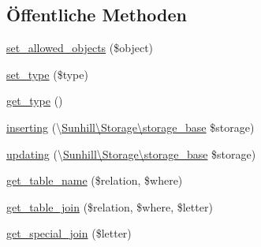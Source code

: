 \subsection*{Öffentliche Methoden}
\begin{DoxyCompactItemize}
\item 
\hyperlink{classSunhill_1_1Properties_1_1oo__property__array__of__objects_ac5f865c8698f0abd0fc96be2673e419a}{set\+\_\+allowed\+\_\+objects} (\$object)
\item 
\hyperlink{classSunhill_1_1Properties_1_1oo__property__array__of__objects_a2f720ceb65f2a78e0ee9f78cdb090d7d}{set\+\_\+type} (\$type)
\item 
\hyperlink{classSunhill_1_1Properties_1_1oo__property__array__of__objects_a0c92ec38fefcb8c0c059cf3919c0185d}{get\+\_\+type} ()
\item 
\hyperlink{classSunhill_1_1Properties_1_1oo__property__array__of__objects_a6086315de9b41712d692611257109da3}{inserting} (\textbackslash{}\hyperlink{classSunhill_1_1Storage_1_1storage__base}{Sunhill\textbackslash{}\+Storage\textbackslash{}storage\+\_\+base} \$storage)
\item 
\hyperlink{classSunhill_1_1Properties_1_1oo__property__array__of__objects_a9f639689e897878022da178dbce62e67}{updating} (\textbackslash{}\hyperlink{classSunhill_1_1Storage_1_1storage__base}{Sunhill\textbackslash{}\+Storage\textbackslash{}storage\+\_\+base} \$storage)
\item 
\hyperlink{classSunhill_1_1Properties_1_1oo__property__array__of__objects_afbca159224514fc8750c1d94b5a89d20}{get\+\_\+table\+\_\+name} (\$relation, \$where)
\item 
\hyperlink{classSunhill_1_1Properties_1_1oo__property__array__of__objects_aa6e647e46e94eda316ff598fd0abfdf7}{get\+\_\+table\+\_\+join} (\$relation, \$where, \$letter)
\item 
\hyperlink{classSunhill_1_1Properties_1_1oo__property__array__of__objects_aadbb06b3a6d2adbc90f1ba59cceb76d8}{get\+\_\+special\+\_\+join} (\$letter)
\end{DoxyCompactItemize}
